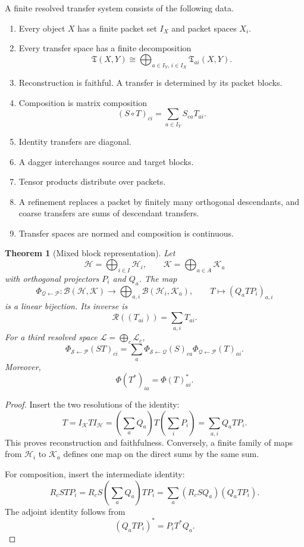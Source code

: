 \documentclass{aomart}
\newtheorem{theorem}{Theorem}[section]
\theoremstyle{definition}
\theoremstyle{remark}
\newcommand{\B}{\mathcal B}
\newcommand{\K}{\mathcal K}
\newcommand{\Hh}{\mathcal H}
\newcommand{\Tcal}{\mathfrak T}
\newcommand{\Rcal}{\mathcal R}
\newcommand{\Lcal}{\mathcal L}
\newcommand{\Pcal}{\mathcal P}
\newcommand{\Qcal}{\mathcal Q}
\begin{document}
\begin{definition}\label{def:finite_resolved_system}
A finite resolved transfer system consists of the following data.
\begin{enumerate}[label=\textup{(R\arabic*)}]
\item Every object \(X\) has a finite packet set \(I_X\) and packet spaces \(X_i\).
\item Every transfer space has a finite decomposition
\[
 \Tcal(X,Y)
 \cong
 \bigoplus_{a\in I_Y,\,i\in I_X}
 \Tcal_{ai}(X,Y).
\]
\item Reconstruction is faithful. A transfer is determined by its packet blocks.
\item Composition is matrix composition
\[
 (S\circ T)_{ci}
 =
 \sum_{a\in I_Y}S_{ca}T_{ai}.
\]
\item Identity transfers are diagonal.
\item A dagger interchanges source and target blocks.
\item Tensor products distribute over packets.
\item A refinement replaces a packet by finitely many orthogonal descendants, and coarse transfers are sums of descendant transfers.
\item Transfer spaces are normed and composition is continuous.
\end{enumerate}
\end{definition}

\begin{theorem}[Mixed block representation]\label{thm:mixed_blocks}
Let
\[
 \Hh=\bigoplus_{i\in I}\Hh_i,
 \qquad
 \K=\bigoplus_{a\in A}\K_a
\]
with orthogonal projectors \(P_i\) and \(Q_a\). The map
\[
 \Phi_{\Qcal\leftarrow\Pcal}:
 \B(\Hh,\K)
 \longrightarrow
 \bigoplus_{a,i}\B(\Hh_i,\K_a),
 \qquad
 T\longmapsto(Q_aTP_i)_{a,i}
\]
is a linear bijection. Its inverse is
\[
 \Rcal((T_{ai}))=\sum_{a,i}T_{ai}.
\]
For a third resolved space \(\Lcal=\bigoplus_c\Lcal_c\),
\[
 \Phi_{\mathcal S\leftarrow\Pcal}(ST)_{ci}
 =
 \sum_a
 \Phi_{\mathcal S\leftarrow\Qcal}(S)_{ca}
 \Phi_{\Qcal\leftarrow\Pcal}(T)_{ai}.
\]
Moreover,
\[
 \Phi(T^*)_{ia}
 =
 \Phi(T)_{ai}^*.
\]
\end{theorem}

\begin{proof}
Insert the two resolutions of the identity:
\[
 T
 =
 I_{\K}TI_{\Hh}
 =
 \left(\sum_aQ_a\right)
 T
 \left(\sum_iP_i\right)
 =
 \sum_{a,i}Q_aTP_i.
\]
This proves reconstruction and faithfulness. Conversely, a finite family of maps from \(\Hh_i\) to \(\K_a\) defines one map on the direct sums by the same sum.

For composition, insert the intermediate identity:
\[
 R_cSTP_i
 =
 R_cS\left(\sum_aQ_a\right)TP_i
 =
 \sum_a(R_cSQ_a)(Q_aTP_i).
\]
The adjoint identity follows from
\[
 (Q_aTP_i)^*=P_iT^*Q_a.
\]
\end{proof}
\end{document}

